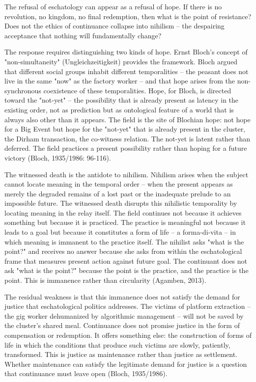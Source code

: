 The refusal of eschatology can appear as a refusal of hope. If there is no revolution, no kingdom, no final redemption, then what is the point of resistance? Does not the ethics of continuance collapse into nihilism -- the despairing acceptance that nothing will fundamentally change?

The response requires distinguishing two kinds of hope. Ernst Bloch's concept of "non-simultaneity" (Ungleichzeitigkeit) provides the framework. Bloch argued that different social groups inhabit different temporalities -- the peasant does not live in the same "now" as the factory worker -- and that hope arises from the non-synchronous coexistence of these temporalities. Hope, for Bloch, is directed toward the "not-yet" -- the possibility that is already present as latency in the existing order, not as prediction but as ontological feature of a world that is always also other than it appears. The field is the site of Blochian hope: not hope for a Big Event but hope for the "not-yet" that is already present in the cluster, the Dirham transaction, the co-witness relation. The not-yet is latent rather than deferred. The field practices a present possibility rather than hoping for a future victory (Bloch, 1935/1986: 96-116).

The witnessed death is the antidote to nihilism. Nihilism arises when the subject cannot locate meaning in the temporal order -- when the present appears as merely the degraded remains of a lost past or the inadequate prelude to an impossible future. The witnessed death disrupts this nihilistic temporality by locating meaning in the relay itself. The field continues not because it achieves something but because it is practiced. The practice is meaningful not because it leads to a goal but because it constitutes a form of life -- a forma-di-vita -- in which meaning is immanent to the practice itself. The nihilist asks "what is the point?" and receives no answer because she asks from within the eschatological frame that measures present action against future goal. The continuant does not ask "what is the point?" because the point is the practice, and the practice is the point. This is immanence rather than circularity (Agamben, 2013).

The residual weakness is that this immanence does not satisfy the demand for justice that eschatological politics addresses. The victims of platform extraction -- the gig worker dehumanized by algorithmic management -- will not be saved by the cluster's shared meal. Continuance does not promise justice in the form of compensation or redemption. It offers something else: the construction of forms of life in which the conditions that produce such victims are slowly, patiently, transformed. This is justice as maintenance rather than justice as settlement. Whether maintenance can satisfy the legitimate demand for justice is a question that continuance must leave open (Bloch, 1935/1986).

